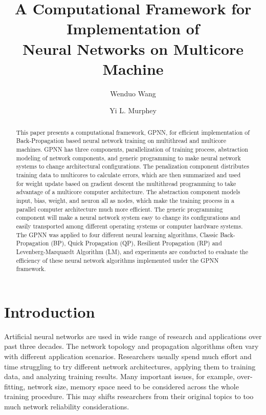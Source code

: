 \documentclass[procedia]{easychair}
\title{A Computational Framework for Implementation of\\
       Neural Networks on Multicore Machine}
\author{
    Wenduo Wang\inst{1}%
\and
    Yi L. Murphey\inst{2}%
}
\institute{
  University of Michigan-Dearborn,
  Dearborn, Michigan, U.S.A\\
  \email{wenduow@umich.edu}
\and
   University of Michigan-Dearborn,
   Dearborn, Michigan, U.S.A\\
   \email{yilu@umich.edu}\\
}
\begin{document}
\maketitle


\begin{abstract}

This paper presents a computational framework, GPNN, for efficient implementation of Back-Propagation based neural network training on multithread and multicore machines. GPNN has three components, parallelization of training process, abstraction modeling of network components, and generic programming to make neural network systems to change architectural configurations.  The penalization component distributes training data to multicores to calculate errors, which are then summarized and used for weight update based on gradient descent the multithread programming to take advantage of a multicore computer architecture.  The abstraction component models input, bias, weight, and neuron all as nodes, which make the training process in a parallel computer architecture much more efficient.  The generic programming component will make a neural network system easy to change its configurations and easily transported among different operating systems or computer hardware systems.  The GPNN was applied to four different neural learning algorithms, Classic Back-Propagation (BP), Quick Propagation (QP), Resilient Propagation (RP) and Levenberg-Marquardt Algorithm (LM), and experiments are conducted to evaluate the efficiency of these neural network algorithms implemented under the GPNN framework.

\end{abstract}


\section{Introduction}

Artificial neural networks are used in wide range of research and applications over past three decades.  The network topology and propagation algorithms often vary with different application scenarios.  Researchers usually spend much effort and time struggling to try different network architectures, applying them to training data, and analyzing training results.  Many important issues, for example, over-fitting, network size, memory space need to be considered across the whole training procedure.  This may shifts researchers from their original topics to too much network reliability considerations.
\end{document}
